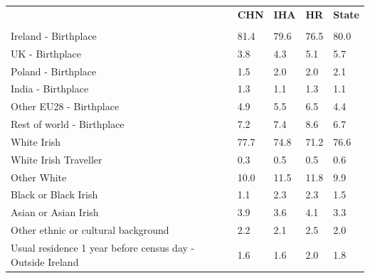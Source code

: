 \documentclass{article}
\begin{document}
\pagebreak
\begin{table}[h]	
\centering
		\begin{tabular}{KTTTT}
  \hline
& \textbf{CHN} & \textbf{IHA} & \textbf{HR}& \textbf{State}\\ 
  \hline
    \\ 
    \hline
Ireland - Birthplace & 81.4& 79.6& 76.5& 80.0\\
UK - Birthplace & 3.8& 4.3& 5.1& 5.7\\
Poland - Birthplace & 1.5& 2.0& 2.0& 2.1\\
India - Birthplace & 1.3& 1.1& 1.3& 1.1\\
Other EU28 - Birthplace & 4.9& 5.5& 6.5& 4.4\\
Rest of world - Birthplace & 7.2& 7.4& 8.6& 6.7\\
    \hline
White Irish & 77.7& 74.8& 71.2& 76.6\\
White Irish Traveller & 0.3& 0.5& 0.5& 0.6\\
Other White & 10.0& 11.5& 11.8&  9.9\\
Black or Black Irish & 1.1& 2.3& 2.3& 1.5\\
Asian or Asian Irish & 3.9& 3.6& 4.1& 3.3\\
Other ethnic or cultural background & 2.2& 2.1& 2.5& 2.0\\
    \hline
Usual residence 1 year before census day - Outside Ireland & 1.6& 1.6& 2.0& 1.8\\


\end{tabular}
\end{table}
\end{document}
